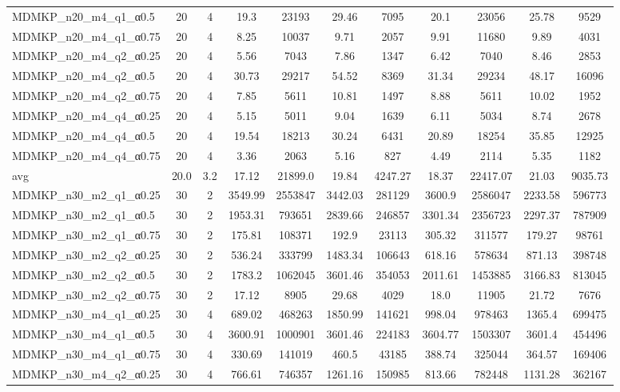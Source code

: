 \begin{table}[!ht]
\begin{tabular}{lcccccccccc}
MDMKP\_n20\_m4\_q1\_α0.5 & 20 & 4 & 19.3 & 23193 & 29.46 & 7095 & 20.1 & 23056 & 25.78 & 9529 \\
MDMKP\_n20\_m4\_q1\_α0.75 & 20 & 4 & 8.25 & 10037 & 9.71 & 2057 & 9.91 & 11680 & 9.89 & 4031 \\
MDMKP\_n20\_m4\_q2\_α0.25 & 20 & 4 & 5.56 & 7043 & 7.86 & 1347 & 6.42 & 7040 & 8.46 & 2853 \\
MDMKP\_n20\_m4\_q2\_α0.5 & 20 & 4 & 30.73 & 29217 & 54.52 & 8369 & 31.34 & 29234 & 48.17 & 16096 \\
MDMKP\_n20\_m4\_q2\_α0.75 & 20 & 4 & 7.85 & 5611 & 10.81 & 1497 & 8.88 & 5611 & 10.02 & 1952 \\
MDMKP\_n20\_m4\_q4\_α0.25 & 20 & 4 & 5.15 & 5011 & 9.04 & 1639 & 6.11 & 5034 & 8.74 & 2678 \\
MDMKP\_n20\_m4\_q4\_α0.5 & 20 & 4 & 19.54 & 18213 & 30.24 & 6431 & 20.89 & 18254 & 35.85 & 12925 \\
MDMKP\_n20\_m4\_q4\_α0.75 & 20 & 4 & 3.36 & 2063 & 5.16 & 827 & 4.49 & 2114 & 5.35 & 1182 \\
\hline avg & 20.0 & 3.2 & 17.12& 21899.0 & 19.84& 4247.27 & 18.37& 22417.07 & 21.03& 9035.73\\ \hline
MDMKP\_n30\_m2\_q1\_α0.25 & 30 & 2 & 3549.99 & 2553847 & 3442.03 & 281129 & 3600.9 & 2586047 & 2233.58 & 596773 \\
MDMKP\_n30\_m2\_q1\_α0.5 & 30 & 2 & 1953.31 & 793651 & 2839.66 & 246857 & 3301.34 & 2356723 & 2297.37 & 787909 \\
MDMKP\_n30\_m2\_q1\_α0.75 & 30 & 2 & 175.81 & 108371 & 192.9 & 23113 & 305.32 & 311577 & 179.27 & 98761 \\
MDMKP\_n30\_m2\_q2\_α0.25 & 30 & 2 & 536.24 & 333799 & 1483.34 & 106643 & 618.16 & 578634 & 871.13 & 398748 \\
MDMKP\_n30\_m2\_q2\_α0.5 & 30 & 2 & 1783.2 & 1062045 & 3601.46 & 354053 & 2011.61 & 1453885 & 3166.83 & 813045 \\
MDMKP\_n30\_m2\_q2\_α0.75 & 30 & 2 & 17.12 & 8905 & 29.68 & 4029 & 18.0 & 11905 & 21.72 & 7676 \\
MDMKP\_n30\_m4\_q1\_α0.25 & 30 & 4 & 689.02 & 468263 & 1850.99 & 141621 & 998.04 & 978463 & 1365.4 & 699475 \\
MDMKP\_n30\_m4\_q1\_α0.5 & 30 & 4 & 3600.91 & 1000901 & 3601.46 & 224183 & 3604.77 & 1503307 & 3601.4 & 454496 \\
MDMKP\_n30\_m4\_q1\_α0.75 & 30 & 4 & 330.69 & 141019 & 460.5 & 43185 & 388.74 & 325044 & 364.57 & 169406 \\
MDMKP\_n30\_m4\_q2\_α0.25 & 30 & 4 & 766.61 & 746357 & 1261.16 & 150985 & 813.66 & 782448 & 1131.28 & 362167 \\

\end{tabular}
\end{table}
